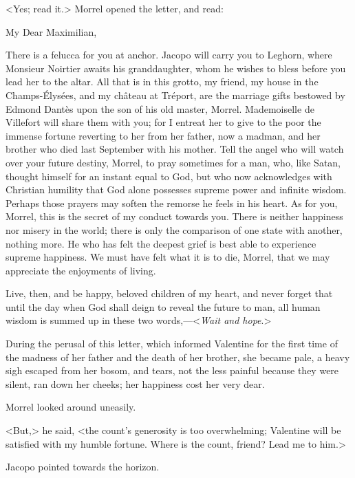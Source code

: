  <Yes; read it.>  Morrel opened the letter, and read: 

\begin{mail}{}{My Dear Maximilian,}

There is a felucca for you at anchor. Jacopo will carry you to Leghorn, where Monsieur Noirtier awaits his granddaughter, whom he wishes to bless before you lead her to the altar. All that is in this grotto, my friend, my house in the Champs-Élysées, and my château at Tréport, are the marriage gifts bestowed by Edmond Dantès upon the son of his old master, Morrel. Mademoiselle de Villefort will share them with you; for I entreat her to give to the poor the immense fortune reverting to her from her father, now a madman, and her brother who died last September with his mother. Tell the angel who will watch over your future destiny, Morrel, to pray sometimes for a man, who, like Satan, thought himself for an instant equal to God, but who now acknowledges with Christian humility that God alone possesses supreme power and infinite wisdom. Perhaps those prayers may soften the remorse he feels in his heart. As for you, Morrel, this is the secret of my conduct towards you. There is neither happiness nor misery in the world; there is only the comparison of one state with another, nothing more. He who has felt the deepest grief is best able to experience supreme happiness. We must have felt what it is to die, Morrel, that we may appreciate the enjoyments of living. 

Live, then, and be happy, beloved children of my heart, and never forget that until the day when God shall deign to reveal the future to man, all human wisdom is summed up in these two words,—<\textit{Wait and hope}.>
\end{mail}

During the perusal of this letter, which informed Valentine for the first time of the madness of her father and the death of her brother, she became pale, a heavy sigh escaped from her bosom, and tears, not the less painful because they were silent, ran down her cheeks; her happiness cost her very dear. 

 Morrel looked around uneasily. 

 <But,> he said, <the count's generosity is too overwhelming; Valentine will be satisfied with my humble fortune. Where is the count, friend? Lead me to him.> 

 Jacopo pointed towards the horizon. 

